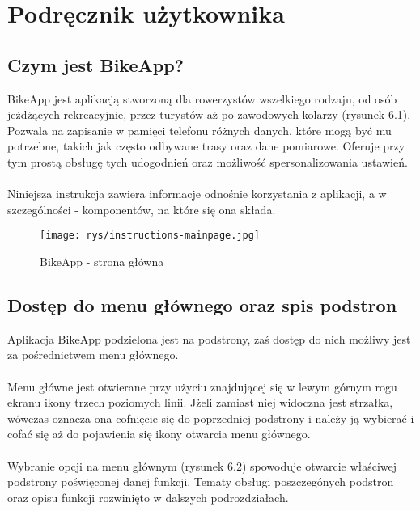 	\newpage
\section{Podręcznik użytkownika}  %

\subsection{Czym jest BikeApp?} %

BikeApp jest aplikacją stworzoną dla rowerzystów wszelkiego rodzaju, od osób jeżdżących rekreacyjnie, przez turystów aż po zawodowych kolarzy (rysunek 6.1). Pozwala na zapisanie w pamięci telefonu różnych danych, które mogą być mu potrzebne, takich jak często odbywane trasy oraz dane pomiarowe. Oferuje przy tym prostą obsługę tych udogodnień oraz możliwość spersonalizowania ustawień.\\
\\
Niniejsza instrukcja zawiera informacje odnośnie korzystania z aplikacji, a w szczególności - komponentów, na które się ona składa.\\

\begin{figure}[!htb]
	\begin{center}
		\texttt{[image: rys/instructions-mainpage.jpg]}
		\caption{BikeApp - strona główna}
		\label{rys:BikeApp - strona główna}
	\end{center}
\end{figure}

\subsection{Dostęp do menu głównego oraz spis podstron} %
Aplikacja BikeApp podzielona jest na podstrony, zaś dostęp do nich możliwy jest za pośrednictwem menu głównego.\\
\\
Menu główne jest otwierane przy użyciu znajdującej się w lewym górnym rogu ekranu ikony trzech poziomych linii. Jżeli zamiast niej widoczna jest strzałka, wówczas oznacza ona cofnięcie się do poprzedniej podstrony i należy ją wybierać i cofać się aż do pojawienia się ikony otwarcia menu głównego.\\
\\
Wybranie opcji na menu głównym (rysunek 6.2) spowoduje otwarcie właściwej podstrony poświęconej danej funkcji. Tematy obsługi poszczegónych podstron oraz opisu funkcji rozwinięto w dalszych podrozdziałach.

